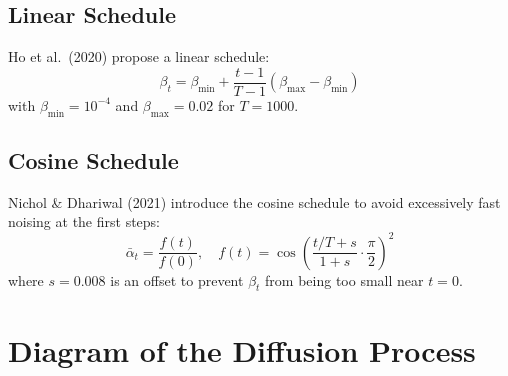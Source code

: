 \subsection{Linear Schedule}

Ho et al.\ (2020) propose a linear schedule:
\begin{equation}
\beta_t = \beta_{\min} + \frac{t - 1}{T - 1}(\beta_{\max} - \beta_{\min})
\end{equation}
with $\beta_{\min} = 10^{-4}$ and $\beta_{\max} = 0.02$ for $T = 1000$.

\subsection{Cosine Schedule}

Nichol \& Dhariwal (2021) introduce the cosine schedule to avoid
excessively fast noising at the first steps:
\begin{equation}
\bar{\alpha}_t = \frac{f(t)}{f(0)}, \quad f(t) = \cos\!\left(\frac{t/T + s}{1 + s} \cdot \frac{\pi}{2}\right)^2
\end{equation}
where $s = 0.008$ is an offset to prevent $\beta_t$ from being too small
near $t = 0$.

\section{Diagram of the Diffusion Process}
\label{sec:tikz-diffusion-process}

